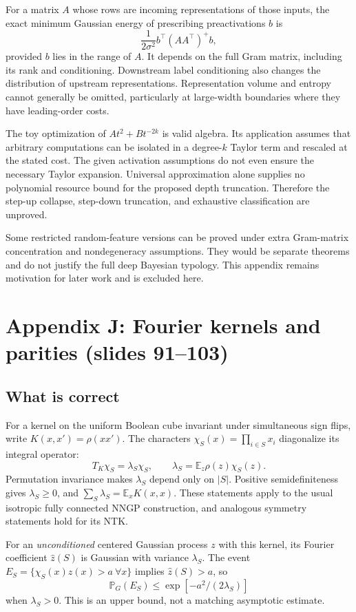 \documentclass[11pt]{article}
\newcommand{\E}{\mathbb E}
\newcommand{\PP}{\mathbb P}
\begin{document}
For a matrix $A$ whose rows are incoming representations of those inputs, the exact minimum Gaussian energy of prescribing preactivations $b$ is
\[
 \frac{1}{2\sigma^2}b^\top(AA^\top)^+b,
\]
provided $b$ lies in the range of $A$. It depends on the full Gram matrix, including its rank and conditioning. Downstream label conditioning also changes the distribution of upstream representations. Representation volume and entropy cannot generally be omitted, particularly at large-width boundaries where they have leading-order costs.

The toy optimization of $At^2+Bt^{-2k}$ is valid algebra. Its application assumes that arbitrary computations can be isolated in a degree-$k$ Taylor term and rescaled at the stated cost. The given activation assumptions do not even ensure the necessary Taylor expansion. Universal approximation alone supplies no polynomial resource bound for the proposed depth truncation. Therefore the step-up collapse, step-down truncation, and exhaustive classification are unproved.

Some restricted random-feature versions can be proved under extra Gram-matrix concentration and nondegeneracy assumptions. They would be separate theorems and do not justify the full deep Bayesian typology. This appendix remains motivation for later work and is excluded here.

\section{Appendix J: Fourier kernels and parities (slides 91--103)}
\subsection*{What is correct}
For a kernel on the uniform Boolean cube invariant under simultaneous sign flips, write $K(x,x')=\rho(xx')$. The characters $\chi_S(x)=\prod_{i\in S}x_i$ diagonalize its integral operator:
\[
 T_K\chi_S=\lambda_S\chi_S,\qquad
 \lambda_S=\E_z\rho(z)\chi_S(z).
\]
Permutation invariance makes $\lambda_S$ depend only on $|S|$. Positive semidefiniteness gives $\lambda_S\geq0$, and $\sum_S\lambda_S=\E_xK(x,x)$. These statements apply to the usual isotropic fully connected NNGP construction, and analogous symmetry statements hold for its NTK.

For an \emph{unconditioned} centered Gaussian process $z$ with this kernel, its Fourier coefficient $\widehat z(S)$ is Gaussian with variance $\lambda_S$. The event $E_S=\{\chi_S(x)z(x)>a\ \forall x\}$ implies $\widehat z(S)>a$, so
\[
 \PP_G(E_S)\leq\exp[-a^2/(2\lambda_S)]
\]
when $\lambda_S>0$. This is an upper bound, not a matching asymptotic estimate.
\end{document}
